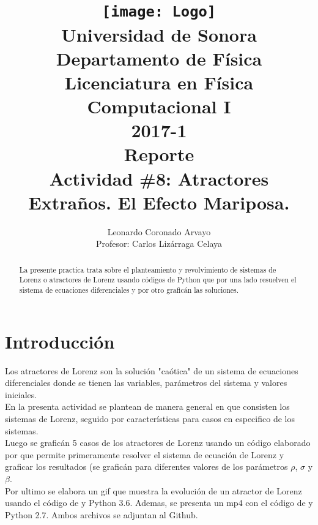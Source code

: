 \documentclass[12pt,letterpaper]{article}
\author{
Leonardo Coronado Arvayo\\
Profesor: Carlos Lizárraga Celaya   \vspace*{1.25in}}
\title{	\texttt{[image: Logo]} \\
Universidad de Sonora \\
{\small Departamento de Física \\
Licenciatura en Física \\
Computacional I \\
2017-1 \\
\vspace{0.55in} Reporte}\\ 
{\Huge Actividad \#8: Atractores Extraños. El Efecto Mariposa. }\\
\vspace*{1.0in}}
\begin{document}
	\maketitle
\newpage
	\tableofcontents
\pagebreak

\begin{abstract}


La presente practica trata sobre el planteamiento y revolvimiento de sistemas de Lorenz o atractores de Lorenz usando códigos de Python que por una lado resuelven el sistema de ecuaciones diferenciales y por otro graficán las soluciones.

\end{abstract}


\section{Introducción}

Los atractores de Lorenz son la solución "caótica" de un sistema de ecuaciones diferenciales donde se tienen las variables, parámetros del sistema y valores iniciales.\\
En la presenta actividad se plantean de manera general en que consisten los sistemas de Lorenz, seguido por características para casos en especifico de los sistemas.\\

Luego se graficán 5 casos de los atractores de Lorenz usando un código elaborado por \cite{c} que permite primeramente resolver el sistema de ecuación de Lorenz y graficar los resultados (se graficán para diferentes valores de los parámetros $\rho$, $\sigma$ y $\beta$.\\

Por ultimo se elabora un gif que muestra la evolución de un atractor de Lorenz usando el código de \cite{d} y Python 3.6. Ademas, se presenta un mp4 con el código de \cite{e} y Python 2.7. Ambos archivos se adjuntan al Github.
\end{document}
